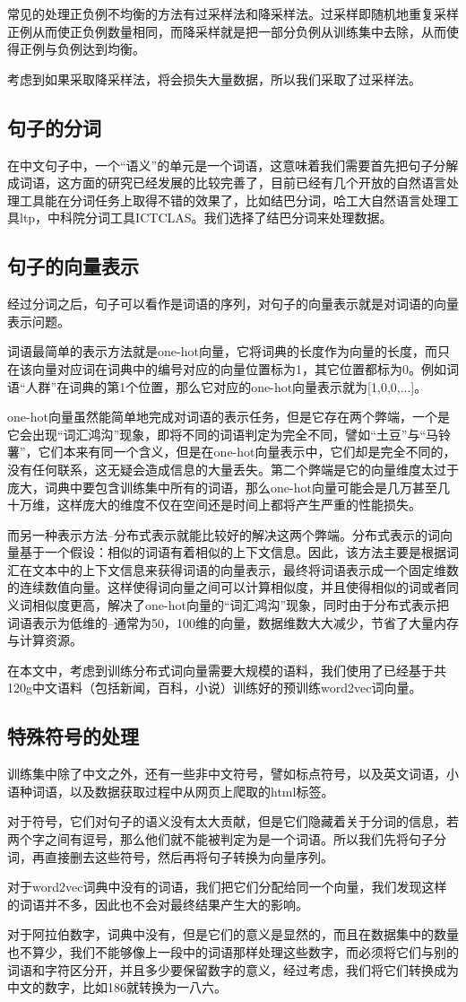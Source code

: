 \documentclass[UTF8]{ctexart}
\begin{document}
常见的处理正负例不均衡的方法有过采样法和降采样法。过采样即随机地重复采样正例从而使正负例数量相同，而降采样就是把一部分负例从训练集中去除，从而使得正例与负例达到均衡。

考虑到如果采取降采样法，将会损失大量数据，所以我们采取了过采样法。
\subsection{句子的分词}
在中文句子中，一个“语义”的单元是一个词语，这意味着我们需要首先把句子分解成词语，这方面的研究已经发展的比较完善了，目前已经有几个开放的自然语言处理工具能在分词任务上取得不错的效果了，比如结巴分词，哈工大自然语言处理工具ltp，中科院分词工具ICTCLAS。我们选择了结巴分词来处理数据。
\subsection{句子的向量表示}
经过分词之后，句子可以看作是词语的序列，对句子的向量表示就是对词语的向量表示问题。

词语最简单的表示方法就是one-hot向量，它将词典的长度作为向量的长度，而只在该向量对应词在词典中的编号对应的向量位置标为1，其它位置都标为0。例如词语“人群”在词典的第1个位置，那么它对应的one-hot向量表示就为[1,0,0,...]。

one-hot向量虽然能简单地完成对词语的表示任务，但是它存在两个弊端，一个是它会出现“词汇鸿沟”现象，即将不同的词语判定为完全不同，譬如“土豆”与“马铃薯”，它们本来有同一个含义，但是在one-hot向量表示中，它们却是完全不同的，没有任何联系，这无疑会造成信息的大量丢失。第二个弊端是它的向量维度太过于庞大，词典中要包含训练集中所有的词语，那么one-hot向量可能会是几万甚至几十万维，这样庞大的维度不仅在空间还是时间上都将产生严重的性能损失。

而另一种表示方法--分布式表示就能比较好的解决这两个弊端。分布式表示的词向量基于一个假设：相似的词语有着相似的上下文信息。因此，该方法主要是根据词汇在文本中的上下文信息来获得词语的向量表示，最终将词语表示成一个固定维数的连续数值向量。这样使得词向量之间可以计算相似度，并且使得相似的词或者同义词相似度更高，解决了one-hot向量的“词汇鸿沟”现象，同时由于分布式表示把词语表示为低维的--通常为50，100维的向量，数据维数大大减少，节省了大量内存与计算资源。

在本文中，考虑到训练分布式词向量需要大规模的语料，我们使用了已经基于共120g中文语料（包括新闻，百科，小说）训练好的预训练word2vec词向量。
\subsection{特殊符号的处理}
训练集中除了中文之外，还有一些非中文符号，譬如标点符号，以及英文词语，小语种词语，以及数据获取过程中从网页上爬取的html标签。

对于符号，它们对句子的语义没有太大贡献，但是它们隐藏着关于分词的信息，若两个字之间有逗号，那么他们就不能被判定为是一个词语。所以我们先将句子分词，再直接删去这些符号，然后再将句子转换为向量序列。

对于word2vec词典中没有的词语，我们把它们分配给同一个向量，我们发现这样的词语并不多，因此也不会对最终结果产生大的影响。

对于阿拉伯数字，词典中没有，但是它们的意义是显然的，而且在数据集中的数量也不算少，我们不能够像上一段中的词语那样处理这些数字，而必须将它们与别的词语和字符区分开，并且多少要保留数字的意义，经过考虑，我们将它们转换成为中文的数字，比如186就转换为一八六。
\end{document}

